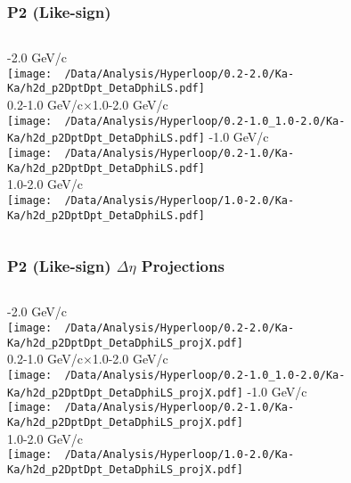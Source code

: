 \documentclass{beamer}
\begin{document}
\begin{frame}
	\frametitle{P2 (Like-sign)}
	\begin{columns}
		-2.0 GeV/c\\
		\texttt{[image: ~/Data/Analysis/Hyperloop/0.2-2.0/Ka-Ka/h2d\_p2DptDpt\_DetaDphiLS.pdf]}\\0.2-1.0 GeV/c$\times$1.0-2.0 GeV/c\\
		\texttt{[image: ~/Data/Analysis/Hyperloop/0.2-1.0\_1.0-2.0/Ka-Ka/h2d\_p2DptDpt\_DetaDphiLS.pdf]}
		-1.0 GeV/c\\
		\texttt{[image: ~/Data/Analysis/Hyperloop/0.2-1.0/Ka-Ka/h2d\_p2DptDpt\_DetaDphiLS.pdf]}\\1.0-2.0 GeV/c\\
		\texttt{[image: ~/Data/Analysis/Hyperloop/1.0-2.0/Ka-Ka/h2d\_p2DptDpt\_DetaDphiLS.pdf]}
	\end{columns}
\end{frame}
\begin{frame}
	\frametitle{P2 (Like-sign) $\Delta\eta$ Projections}
	\begin{columns}
		\column{0.5\textwidth}
		-2.0 GeV/c\\
		\texttt{[image: ~/Data/Analysis/Hyperloop/0.2-2.0/Ka-Ka/h2d\_p2DptDpt\_DetaDphiLS\_projX.pdf]}\\0.2-1.0 GeV/c$\times$1.0-2.0 GeV/c\\
		\texttt{[image: ~/Data/Analysis/Hyperloop/0.2-1.0\_1.0-2.0/Ka-Ka/h2d\_p2DptDpt\_DetaDphiLS\_projX.pdf]}
		\column{0.5\textwidth}
		-1.0 GeV/c\\
		\texttt{[image: ~/Data/Analysis/Hyperloop/0.2-1.0/Ka-Ka/h2d\_p2DptDpt\_DetaDphiLS\_projX.pdf]}\\1.0-2.0 GeV/c\\
		\texttt{[image: ~/Data/Analysis/Hyperloop/1.0-2.0/Ka-Ka/h2d\_p2DptDpt\_DetaDphiLS\_projX.pdf]}
	\end{columns}
\end{frame}
\end{document}
